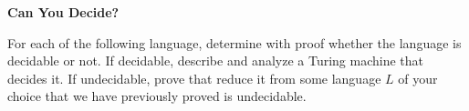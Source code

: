 \documentclass[11pt,addpoints]{exam}
\newcommand{\LOddF}{L_\textsc{odd-5}}
\begin{document}
\begin{questions}

 \question \textbf{Can You Decide?}

    For each of the following language, determine with proof whether the language is decidable or not. If decidable, describe and analyze a Turing machine that decides it. If undecidable, prove that reduce it from some language $L$ of your choice that we have previously proved is undecidable.

\end{questions}
\end{document}
